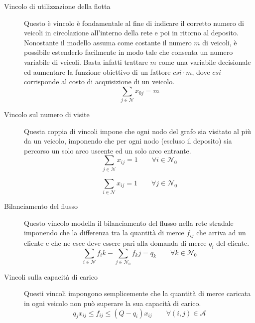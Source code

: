 		\begin{description}
			\item[Vincolo di utilizzazione della flotta]
				Questo è vincolo è fondamentale al fine di indicare il corretto numero di veicoli in circolazione all’interno della rete e poi in ritorno al deposito. Nonostante il modello assuma come costante il numero $m$ di veicoli, è possibile estenderlo facilmente in modo tale che consenta un numero variabile di veicoli. Basta infatti trattare $m$ come una variabile decisionale ed aumentare la funzione obiettivo di un fattore $csi \cdot m$, dove $csi$ corrisponde al costo di acquisizione di un veicolo.
				\begin{equation}
					\label{eq:fleet_usage}
					\sum_{j \in \mathcal{N}} x_{0j} = m
				\end{equation}

			\item[Vincolo sul numero di visite]
				Questa coppia di vincoli impone che 	ogni nodo del grafo sia visitato al più da un veicolo, imponendo che per ogni nodo (escluso il deposito) sia percorso un solo arco uscente ed un solo arco entrante.
				\begin{equation}
					\label{eq:single_exit}
					\sum_{j \in \mathcal{N}} x_{ij} = 1 
					\qquad 
					\forall i \in \mathcal{N}_0
				\end{equation}

				\begin{equation}
					\label{eq:single_entrance}
					\sum_{i \in \mathcal{N}} x_{ij} = 1 
					\qquad 
					\forall j \in \mathcal{N}_0
				\end{equation}

			\item[Bilanciamento del flusso]
				Questo vincolo modella il bilanciamento del flusso nella rete stradale imponendo che la differenza tra la quantità di merce $f_{ij}$ che arriva ad un cliente e che ne esce deve essere pari alla domanda di merce $q_i$ del cliente.
				\begin{equation}
					\label{eq:flux_balance}
					\sum_{i \in \mathcal{N}}f_ik - \sum_{j \in \mathcal{N}_0}f_kj = q_k  
					\qquad
					\forall k \in \mathcal{N}_0
				\end{equation}

			\item[Vincoli sulla capacità di carico]
				Questi vincoli impongono semplicemente che la quantità di merce caricata in ogni veicolo non può superare la sua capacità di carico.
				\begin{equation}
					\label{eq:capacity_constraint}
					q_j x_{ij} \leq f_{ij} \leq (Q - q_i)x_{ij} 
					\qquad
					\forall (i,j) \in \mathcal{A} 
				\end{equation}


\end{description}
